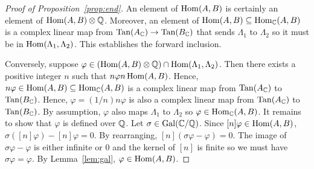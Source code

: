 \documentclass{article}
\begin{document}
\begin{proof}[Proof of Proposition~\ref{prop:end}]
    An element of $\operatorname{Hom}(A, B)$ is certainly an element of $\operatorname{Hom}(A, B)\otimes
    \mathbb{Q}$. Moreover, an element of $\operatorname{Hom}(A, B) \subseteq \operatorname{Hom}_{\mathbb{C}} (A,B)$ is a
    complex linear map from $\operatorname{Tan}(A_{\mathbb{C}})\to \operatorname{Tan}(B_{\mathbb{C}})$ that sends $\Lambda_1$
    to $\Lambda_2$ so it must be in $\operatorname{Hom}(\Lambda_1,\Lambda_2)$. This
    establishes the forward inclusion.

    Conversely, suppose $\varphi\in (\operatorname{Hom}(A, B)\otimes \mathbb{Q})\cap \operatorname{Hom}(\Lambda_1,
    \Lambda_2)$. Then there exists a positive integer $n$ such that $n\varphi n
    \operatorname{Hom}(A, B)$. Hence, $n\varphi\in \operatorname{Hom}(A,B)\subseteq \operatorname{Hom}_{\mathbb{C}}(A, B)$ is a
    complex linear map from $\operatorname{Tan}(A_{\mathbb{C}})$ to $\operatorname{Tan}(B_{\mathbb{C}})$. Hence,
    $\varphi=(1/n)n\varphi$ is also a complex linear map from $\operatorname{Tan}(A_{\mathbb{C}})$ to
    $\operatorname{Tan}(B_{\mathbb{C}})$. By assumption, $\varphi$ also maps $\Lambda_1$ to
    $\Lambda_2$ so $\varphi\in \operatorname{Hom}_{\mathbb{C}}(A,B)$. It remains to show that
    $\varphi$ is defined over $\mathbb{Q}$. Let $\sigma\in \operatorname{Gal}(\mathbb{C}/\mathbb{Q})$. Since
    $[n]\varphi\in \operatorname{Hom}(A,B)$, $\sigma([n]\varphi)-[n]\varphi=0$. By
    rearranging, $[n](\sigma\varphi-\varphi)=0$. The image of
    $\sigma\varphi-\varphi$ is either infinite or 0 and the kernel of $[n]$ is
    finite so we must have $\sigma\varphi=\varphi$. By Lemma~\ref{lem:gal},
    $\varphi\in \operatorname{Hom}(A,B)$.
\end{proof}
\end{document}
